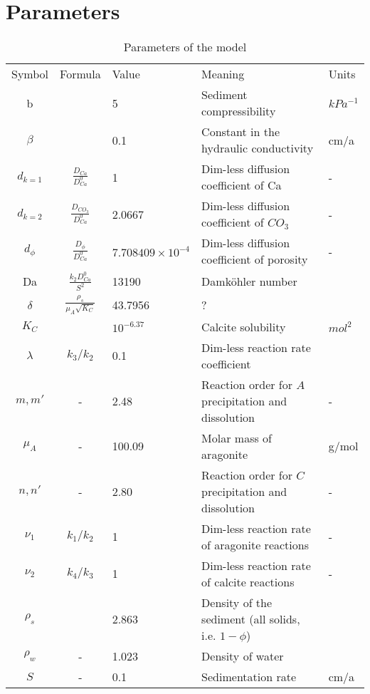 \documentclass[10pt, letterpaper]{article}
\begin{document}
\section{Parameters}

\begin{table}[hbt!]
    \centering
    \begin{tabular}{cclll}
 Symbol& Formula& Value&Meaning &Units\\
 b& & 5& Sediment compressibility&$kPa^{-1}$\\
 $\beta$& & 0.1& Constant in the hydraulic conductivity&cm/a\\
 $d_{k=1}$& $\frac{D_{Ca}}{D_{Ca}^0}$& 1& Dim-less diffusion coefficient of Ca&-\\
 $d_{k=2}$& $\frac{D_{CO_{3}}}{D_{Ca}^0}$& 2.0667& Dim-less diffusion coefficient of $CO_3$&-\\
 $d_\phi$& $\frac{D_\phi}{D_{Ca}^0}$& $7.708409\times10^{-4}$& Dim-less diffusion coefficient of porosity&-\\
         Da&  $\frac{k_2D_{Ca}^0}{S^2}$& 13190&Damköhler number &\\
 $\delta$& $\frac{\rho_s}{\mu_A\sqrt{K_C}}$& 43.7956& ?&\\
 $K_C$& & $10^{-6.37}$& Calcite solubility&$mol^2$\\
         $\lambda$&  $k_3/k_2$& 0.1& Dim-less reaction rate coefficient&\\
 $m, m'$& -& 2.48&Reaction order for $A$ precipitation and dissolution&-\\
 $\mu_A$& -& 100.09& Molar mass of aragonite&g/mol\\
 $n, n'$& -& 2.80&Reaction order for $C$ precipitation and dissolution&-\\
         $\nu_1$&  $k_1/k_2$& 1& Dim-less reaction rate of aragonite reactions&-\\
         $\nu_2$&  $k_4/k_3$& 1& Dim-less reaction rate of calcite reactions&-\\
         $\rho_s$&  & 2.863& Density of the sediment (all solids, i.e. $1 - \phi$)&\\
         $\rho_w$&  -& 1.023& Density of water&\\
 $S$& -& 0.1& Sedimentation rate&cm/a\\
    \end{tabular}
    \caption{Parameters of the model}
\end{table}
\end{document}

